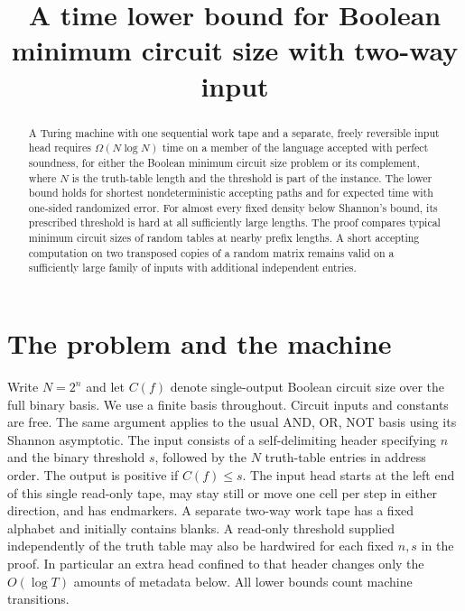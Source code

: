 \documentclass[11pt]{article}
\title{A time lower bound for Boolean minimum circuit size with two-way input}
\author{}
\date{}
\begin{document}
\maketitle
\begin{abstract}
A Turing machine with one sequential work tape and a separate, freely reversible input head requires $\Omega(N\log N)$ time on a member of the language accepted with perfect soundness, for either the Boolean minimum circuit size problem or its complement, where $N$ is the truth-table length and the threshold is part of the instance. The lower bound holds for shortest nondeterministic accepting paths and for expected time with one-sided randomized error. For almost every fixed density below Shannon's bound, its prescribed threshold is hard at all sufficiently large lengths. The proof compares typical minimum circuit sizes of random tables at nearby prefix lengths. A short accepting computation on two transposed copies of a random matrix remains valid on a sufficiently large family of inputs with additional independent entries.
\end{abstract}

\section{The problem and the machine}

Write $N=2^n$ and let $C(f)$ denote single-output Boolean circuit size over the full binary basis. We use a finite basis throughout. Circuit inputs and constants are free. The same argument applies to the usual AND, OR, NOT basis using its Shannon asymptotic. The input consists of a self-delimiting header specifying $n$ and the binary threshold $s$, followed by the $N$ truth-table entries in address order. The output is positive if $C(f)\le s$. The input head starts at the left end of this single read-only tape, may stay still or move one cell per step in either direction, and has endmarkers. A separate two-way work tape has a fixed alphabet and initially contains blanks. A read-only threshold supplied independently of the truth table may also be hardwired for each fixed $n,s$ in the proof. In particular an extra head confined to that header changes only the $O(\log T)$ amounts of metadata below. All lower bounds count machine transitions.
\end{document}

